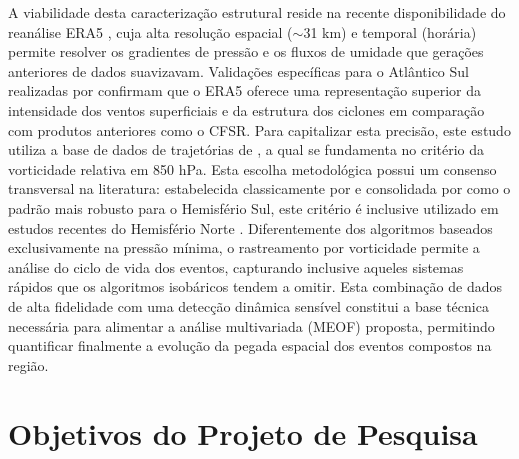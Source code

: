 A viabilidade desta caracterização estrutural reside na recente disponibilidade do reanálise ERA5 \citep{hersbach2020era5}, cuja alta resolução espacial ($\sim$31 km) e temporal (horária) permite resolver os gradientes de pressão e os fluxos de umidade que gerações anteriores de dados suavizavam. Validações específicas para o Atlântico Sul realizadas por \citet{gramcianinov2020analysis} confirmam que o ERA5 oferece uma representação superior da intensidade dos ventos superficiais e da estrutura dos ciclones em comparação com produtos anteriores como o CFSR.
Para capitalizar esta precisão, este estudo utiliza a base de dados de trajetórias de \citet{coutodesouza2024new}, a qual se fundamenta no critério da vorticidade relativa em 850 hPa. Esta escolha metodológica possui um consenso transversal na literatura: estabelecida classicamente por \citet{sinclair1994objective} e consolidada por \citet{padilhareinke2024objective} como o padrão mais robusto para o Hemisfério Sul, este critério é inclusive utilizado em estudos recentes do Hemisfério Norte \citep{chen2025characteristics}.
Diferentemente dos algoritmos baseados exclusivamente na pressão mínima, o rastreamento por vorticidade permite a análise do ciclo de vida dos eventos, capturando inclusive aqueles sistemas rápidos que os algoritmos isobáricos tendem a omitir. Esta combinação de dados de alta fidelidade com uma detecção dinâmica sensível constitui a base técnica necessária para alimentar a análise multivariada (MEOF) proposta, permitindo quantificar finalmente a evolução da pegada espacial dos eventos compostos na região.
\section{Objetivos do Projeto de Pesquisa}

